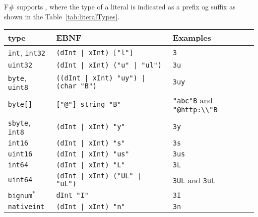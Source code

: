 F\# supports , where the type of a literal is indicated as a prefix og suffix as shown in the Table~\ref{tab:literalTypes}.
\begin{table}
  \centering
  \begin{tabular}{|l|l|l|}
    \hline
    type & EBNF & Examples \\
    \hline
    \lstinline!int!, \lstinline!int32! & \lstinline[language=ebnf]!(dInt | xInt) ["l"]!  & \lstinline!3! \\
    \lstinline!uint32! & \lstinline[language=ebnf]!(dInt | xInt) ("u" | "ul")! & \lstinline!3u! \\
    \lstinline!byte!, \lstinline!uint8! & \lstinline[language=ebnf]!((dInt | xInt) "uy") | (char "B")!  & \lstinline!3uy!  \\
    \lstinline!byte[]! & \lstinline[language=ebnf]!["@"] string "B"!  & \lstinline!"abc"B! and \lstinline!"@http:\\"B!  \\
    \lstinline!sbyte!, \lstinline!int8! & \lstinline[language=ebnf]!(dInt | xInt) "y"! & \lstinline!3y!  \\
    \lstinline!int16! & \lstinline[language=ebnf]!(dInt | xInt) "s"!  & \lstinline!3s!  \\
    \lstinline!uint16! & \lstinline[language=ebnf]!(dInt | xInt) "us"! & \lstinline!3us!  \\
    \lstinline!int64! & \lstinline[language=ebnf]!(dInt | xInt) "L"!  & \lstinline!3L!  \\
    \lstinline!uint64! & \lstinline[language=ebnf]!(dInt | xInt) ("UL" | "uL")!  & \lstinline!3UL! and \lstinline!3uL!  \\
    \lstinline!bignum!$^*$ & \lstinline[language=ebnf]!dInt "I"! & \lstinline!3I!  \\
    \lstinline!nativeint! & \lstinline[language=ebnf]!(dInt | xInt) "n"! & \lstinline!3n!  \\

\end{tabular}
\end{table}
